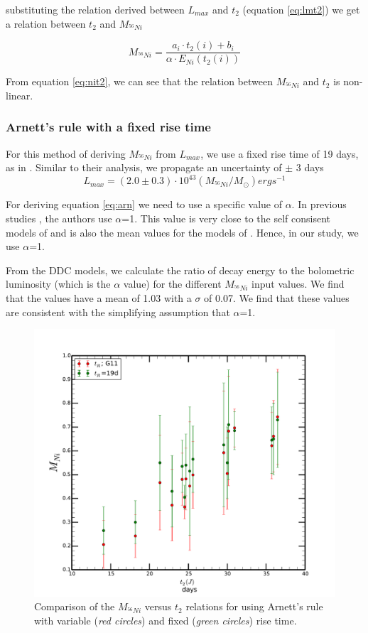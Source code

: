 substituting the relation derived between $L_{max}$ and $t_2$ (equation \eqref{eq:lmt2}) we get a relation between $t_2$ and $M_{^{56}Ni}$

\begin{equation}
\label{eq:nit2}
M_{^{56}Ni}= \frac{a_i \cdot t_2(i) + b_i}{\alpha \cdot E_{Ni}(t_2(i))} 
\end{equation}

From equation \eqref{eq:nit2}, we can see that the relation between $M_{^{56}Ni}$ and $t_2$ is non-linear.  

 
\subsubsection{Arnett's rule with a fixed rise time}
For this method of deriving $M_{^{56}Ni}$ from $L_{max}$, we use a fixed rise time of 19 days, as in \citet{Stritzinger2006}. Similar to their analysis, we propagate an uncertainty of $\pm$ 3 days 
\begin{equation}
\label{eq:arn}
L_{max}=(2.0 \pm 0.3) \cdot 10^{43} (M_{^{56}Ni}/M_{\odot}) erg s^{-1}
\end{equation}

For deriving equation \eqref{eq:arn} we need to use a specific value of $\alpha$. In previous studies \citep[eg.][]{Stritzinger2006,Mazzali2007}, the authors use $\alpha$=1. This value is very close to the self consisent models of \citet{Arnett1982} and is also the mean values for the models of \citet{Hoeflich1995}. Hence, in our study, we use $\alpha$=1.

From the DDC models, we calculate the ratio of decay energy to the bolometric luminosity (which is the $\alpha$ value) for the different $M_{^{56}Ni}$ input values. We find that the values have a mean of 1.03 with a $\sigma$ of 0.07. We find that these values are consistent with the simplifying assumption that $\alpha$=1.
  
\begin{figure}
\includegraphics[width=.5\textwidth, trim= 0 30 0 30]{../plot_rel/comp_tr_nit2.pdf}
\caption{Comparison of the $M_{^{56}Ni}$ versus $t_2$ relations for using Arnett's rule with variable (\emph{red circles}) and fixed (\emph{green circles}) rise time. }
\end{figure}

